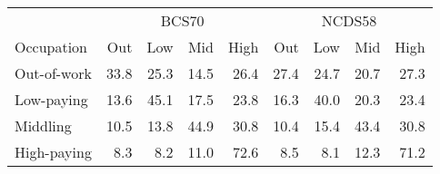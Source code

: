 
\begin{tabular}{lrrrrrrrr}
\toprule
\multicolumn{1}{c}{} & \multicolumn{4}{c}{BCS70} & \multicolumn{4}{c}{NCDS58} \\
\cmidrule(l{3pt}r{3pt}){2-5} \cmidrule(l{3pt}r{3pt}){6-9}
Occupation & Out & Low & Mid & High & Out & Low & Mid & High\\
\midrule
Out-of-work & 33.8 & 25.3 & 14.5 & 26.4 & 27.4 & 24.7 & 20.7 & 27.3\\
Low-paying & 13.6 & 45.1 & 17.5 & 23.8 & 16.3 & 40.0 & 20.3 & 23.4\\
Middling & 10.5 & 13.8 & 44.9 & 30.8 & 10.4 & 15.4 & 43.4 & 30.8\\
High-paying & 8.3 & 8.2 & 11.0 & 72.6 & 8.5 & 8.1 & 12.3 & 71.2\\
\bottomrule
\end{tabular}
